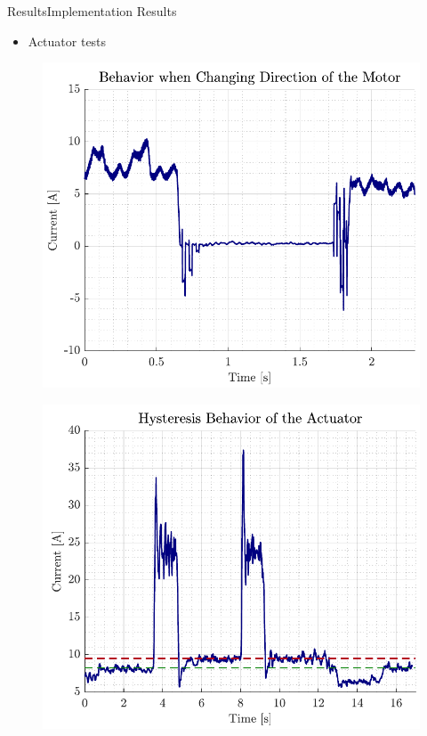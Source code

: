 \begin{frame}{Results}{Implementation Results}
    \begin{itemize}
        \item Actuator tests
    \end{itemize}
    \begin{minipage}{0.5\linewidth}
        \begin{figure}[H]
            \centering
            \includegraphics[width=1\linewidth]{figures/direction}
        \end{figure}       
    \end{minipage}\hfill      
    \begin{minipage}{0.5\linewidth}
        \begin{figure}[H]
            \centering
            \includegraphics[width=1\linewidth]{figures/hysteresis}
        \end{figure}             
    \end{minipage}\hfill \\    
\end{frame}

